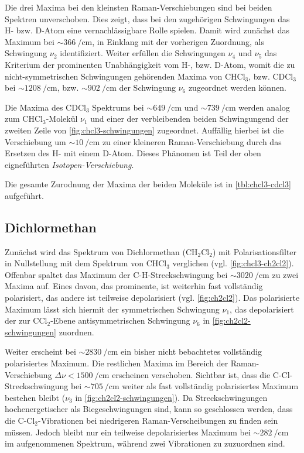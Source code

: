 \documentclass[../bericht.tex]{subfiles}
\begin{document}
        Die drei Maxima bei den kleinsten Raman-Verschiebungen sind bei beiden Spektren unverschoben. Dies zeigt, dass bei den zugehörigen Schwingungen das H- bzw. D-Atom eine vernachlässigbare Rolle spielen. Damit wird zunächst das Maximum bei $\sim\SI{366}{\per\centi\meter}$, in Einklang mit der vorherigen Zuordnung, als Schwingung $\nu_2$ identifiziert. Weiter erfüllen die Schwingungen $\nu_4$ und $\nu_5$ das Kriterium der prominenten Unabhängigkeit vom H-, bzw. D-Atom, womit die zu nicht-symmetrischen Schwingungen gehörenden Maxima von $\mathrm{CHCl_3}$, bzw. $\mathrm{CDCl_3}$ bei $\sim\SI{1208}{\per\centi\meter}$, bzw. $\sim\SI{902}{\per\centi\meter}$ der Schwingung $\nu_6$ zugeordnet werden können.

        Die Maxima des $\mathrm{CDCl_3}$ Spektrums bei $\sim\SI{649}{\per\centi\meter}$ und $\sim \SI{739}{\per\centi\meter}$ werden analog zum $\mathrm{CHCl_3}$-Molekül $\nu_1$ und einer der verbleibenden beiden Schwingungend der zweiten Zeile von \cref{fig:chcl3-schwingungen} zugeordnet. Auffällig hierbei ist die Verschiebung um $\sim\SI{10}{\per\centi\meter}$ zu einer kleineren Raman-Verschiebung durch das Ersetzen des H- mit einem D-Atom. Dieses Phänomen ist Teil der oben eigneführten \textit{Isotopen-Verschiebung}.
        \medskip

        Die gesamte Zurodnung der Maxima der beiden Moleküle ist in \cref{tbl:chcl3-cdcl3} aufgeführt.


      \subsection{Dichlormethan}

        Zunächst wird das Spektrum von Dichlormethan ($\mathrm{CH_2Cl_2}$) mit Polarisationsfilter in Nullstellung mit dem Spektrum von $\mathrm{CHCl_3}$ verglichen (vgl. \cref{fig:chcl3-ch2cl2}). Offenbar spaltet das Maximum der C-H-Streckschwingung bei $\sim\SI{3020}{\per\centi\meter}$ zu zwei Maxima auf. Eines davon, das prominente, ist weiterhin fast vollständig polarisiert, das andere ist teilweise depolarisiert (vgl. \cref{fig:ch2cl2}). Das polarisierte Maximum lässt sich hiermit der symmetrischen Schwingung $\nu_1$, das depolarisiert der zur $\mathrm{CCl_2}$-Ebene antisymmetrischen Schwingung $\nu_6$ in \cref{fig:ch2cl2-schwingungen} zuordnen.

        Weiter erscheint bei $\sim\SI{2830}{\per\centi\meter}$ ein bisher nicht bebachtetes vollständig polarisiertes Maximum. Die restlichen Maxima im Bereich der Raman-Verschiebung $\Delta \nu < \SI{1500}{\per\centi\meter}$ erscheinen verschoben. Sichtbar ist, dass die C-Cl-Streckschwingung bei $\sim\SI{705}{\per\centi\meter}$ weiter als fast vollständig polarisiertes Maximum bestehen bleibt ($\nu_3$ in \cref{fig:ch2cl2-schwingungen}). Da Streckschwingungen hochenergetischer als Biegeschwingungen sind, kann so geschlossen werden, dass die C-$\mathrm{Cl_2}$-Vibrationen bei niedrigeren Raman-Verscheibungen zu finden sein müssen. Jedoch bleibt nur ein teilweise depolarisiertes Maximum bei $\sim\SI{282}{\per\centi\meter}$ im aufgenommenen Spektrum, während zwei Vibrationen zu zuzuordnen sind.
\end{document}
